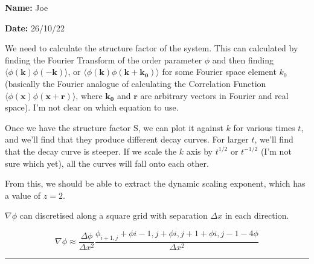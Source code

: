 \documentclass{article}
\begin{document}
\textbf{Name:} Joe

\textbf{Date:} 26/10/22

\bigskip

We need to calculate the structure factor of the system. This can calculated by finding the Fourier Transform of the order parameter $\phi$ and then finding $\langle \phi(\boldsymbol{k})\phi(\boldsymbol{-k})\rangle$, or $\langle \phi(\boldsymbol{k})\phi(\boldsymbol{k}+\boldsymbol{k_{0}})\rangle$ for some Fourier space element $k_{0}$ (basically the Fourier analogue of calculating the Correlation Function $\langle\phi(\boldsymbol{x})\phi(\boldsymbol{x}+\boldsymbol{r})\rangle$, where $\boldsymbol{k_{0}}$ and $\boldsymbol{r}$ are arbitrary vectors in Fourier and real space). I'm not clear on which equation to use.

\medskip

Once we have the structure factor S, we can plot it against $k$ for various times $t$, and we'll find that they produce different decay curves. For larger $t$, we'll find that the decay curve is steeper. If we scale the $k$ axis by $t^{1/2}$ or $t^{-1/2}$ (I'm not sure which yet), all the curves will fall onto each other.



From this, we should be able to extract the dynamic scaling exponent, which has a value of $z=2$.

\medskip

$\nabla\phi$ can discretised along a square grid with separation $\Delta x$ in each direction.

\begin{equation}
	\nabla \phi \approx \frac{\Delta \phi}{\Delta x^{2}} \frac{\phi_{i+1,j} + \phi{i-1,j} + \phi{i,j+1} + \phi{i,j-1}-4\phi}{\Delta x^{2}}
\end{equation}

\rule{\textwidth}{0.4pt}
\end{document}

